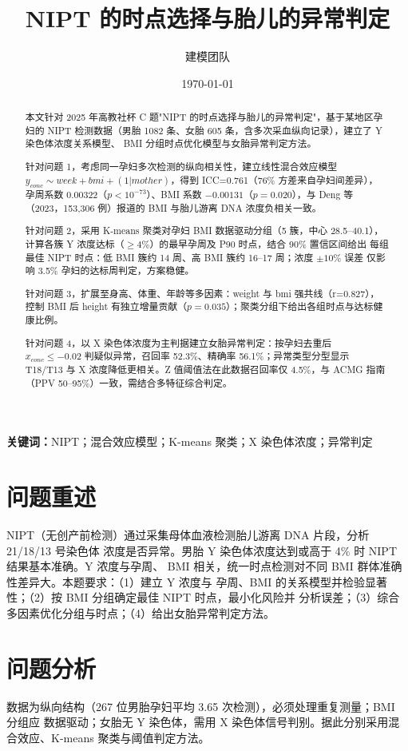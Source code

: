 \documentclass[11pt]{ctexart}
\title{NIPT 的时点选择与胎儿的异常判定}
\author{建模团队}
\date{\today}
\begin{document}
\maketitle
\begin{abstract}
本文针对 2025 年高教社杯 C 题"NIPT 的时点选择与胎儿的异常判定"，基于某地区孕妇的 NIPT
检测数据（男胎 1082 条、女胎 605 条，含多次采血纵向记录），建立了 Y 染色体浓度关系模型、
BMI 分组时点优化模型与女胎异常判定方法。

针对问题 1，考虑同一孕妇多次检测的纵向相关性，建立线性混合效应模型
$y_{conc} \sim week + bmi + (1|mother)$，得到 ICC=0.761（76\% 方差来自孕妇间差异），
孕周系数 0.00322（$p<10^{-73}$）、BMI 系数 $-0.00131$（$p=0.020$），与 Deng 等
（2023，153,306 例）报道的 BMI 与胎儿游离 DNA 浓度负相关一致。

针对问题 2，采用 K-means 聚类对孕妇 BMI 数据驱动分组（5 簇，中心 28.5--40.1），
计算各簇 Y 浓度达标（$\geq 4\%$）的最早孕周及 P90 时点，结合 90\% 置信区间给出
每组最佳 NIPT 时点：低 BMI 簇约 14 周、高 BMI 簇约 16--17 周；浓度 $\pm10\%$ 误差
仅影响 3.5\% 孕妇的达标周判定，方案稳健。

针对问题 3，扩展至身高、体重、年龄等多因素：weight 与 bmi 强共线（r=0.827），
控制 BMI 后 height 有独立增量贡献（$p=0.035$）；聚类分组下给出各组时点与达标健康比例。

针对问题 4，以 X 染色体浓度为主判据建立女胎异常判定：按孕妇去重后
$x_{conc} \leq -0.02$ 判疑似异常，召回率 52.3\%、精确率 56.1\%；异常类型分型显示
T18/T13 与 X 浓度降低更相关。Z 值阈值法在此数据召回率仅 4.5\%，与 ACMG 指南
（PPV 50--95\%）一致，需结合多特征综合判定。
\end{abstract}

\noindent\textbf{关键词：}NIPT；混合效应模型；K-means 聚类；X 染色体浓度；异常判定

\section{问题重述}\label{sec:problem}
NIPT（无创产前检测）通过采集母体血液检测胎儿游离 DNA 片段，分析 21/18/13 号染色体
浓度是否异常。男胎 Y 染色体浓度达到或高于 4\% 时 NIPT 结果基本准确。Y 浓度与孕周、
BMI 相关，统一时点检测对不同 BMI 群体准确性差异大。本题要求：（1）建立 Y 浓度与
孕周、BMI 的关系模型并检验显著性；（2）按 BMI 分组确定最佳 NIPT 时点，最小化风险并
分析误差；（3）综合多因素优化分组与时点；（4）给出女胎异常判定方法。

\section{问题分析}\label{sec:analysis}
数据为纵向结构（267 位男胎孕妇平均 3.65 次检测），必须处理重复测量；BMI 分组应
数据驱动；女胎无 Y 染色体，需用 X 染色体信号判别。据此分别采用混合效应、K-means
聚类与阈值判定方法。
\end{document}
